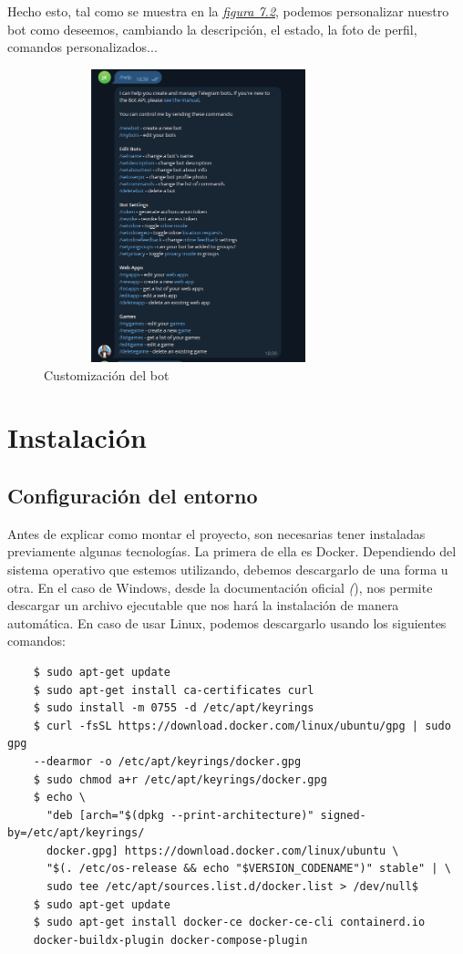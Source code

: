 Hecho esto, tal como se muestra en la \textit{\hyperref[fig:customize-bot]{figura 7.2}}, podemos personalizar nuestro bot como deseemos, cambiando la descripción, el estado, la foto de perfil, comandos personalizados...

\begin{figure}[!ht]
    \centering
    \includegraphics[width=0.8\textwidth, height=8.5cm]{imagenes/bot_custom.png}
    \caption{ Customización del bot }
    \label{fig:customize-bot}
\end{figure}



\section{Instalación}

\subsection{Configuración del entorno}

Antes de explicar como montar el proyecto, son necesarias tener instaladas previamente algunas tecnologías.
La primera de ella es Docker. Dependiendo del sistema operativo que estemos utilizando, debemos descargarlo de una forma u otra. En el caso de Windows, desde la documentación oficial  \textit({\cite{docker})}, nos permite descargar un archivo ejecutable que nos hará la instalación de manera automática. En caso de usar Linux, podemos descargarlo usando los siguientes comandos:

\begin{verbatim}
    $ sudo apt-get update
    $ sudo apt-get install ca-certificates curl 
    $ sudo install -m 0755 -d /etc/apt/keyrings
    $ curl -fsSL https://download.docker.com/linux/ubuntu/gpg | sudo gpg 
    --dearmor -o /etc/apt/keyrings/docker.gpg
    $ sudo chmod a+r /etc/apt/keyrings/docker.gpg
    $ echo \
      "deb [arch="$(dpkg --print-architecture)" signed-by=/etc/apt/keyrings/
      docker.gpg] https://download.docker.com/linux/ubuntu \
      "$(. /etc/os-release && echo "$VERSION_CODENAME")" stable" | \
      sudo tee /etc/apt/sources.list.d/docker.list > /dev/null$
    $ sudo apt-get update
    $ sudo apt-get install docker-ce docker-ce-cli containerd.io 
    docker-buildx-plugin docker-compose-plugin
\end{verbatim}

